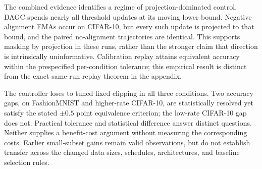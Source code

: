 The combined evidence identifies a regime of projection-dominated control.
DAGC spends nearly all threshold updates at its moving lower bound. Negative
alignment EMAs occur on CIFAR-10, but every such update is projected to that
bound, and the paired no-alignment trajectories are identical. This supports
masking by projection in these runs, rather than the stronger claim that
direction is intrinsically uninformative. Calibration replay attains equivalent
accuracy within the prespecified per-condition tolerance; this empirical
result is distinct from the exact same-run replay theorem in the appendix.

The controller loses to tuned fixed clipping in all three conditions. Two
accuracy gaps, on FashionMNIST and higher-rate CIFAR-10, are statistically
resolved yet satisfy the stated $\pm0.5$ point equivalence criterion; the
low-rate CIFAR-10 gap does not. Practical tolerance and statistical difference
answer distinct questions. Neither supplies a benefit-cost argument without
measuring the corresponding costs. Earlier small-subset gains remain valid
observations, but do not establish transfer across the changed data sizes,
schedules, architectures, and baseline selection rules.
